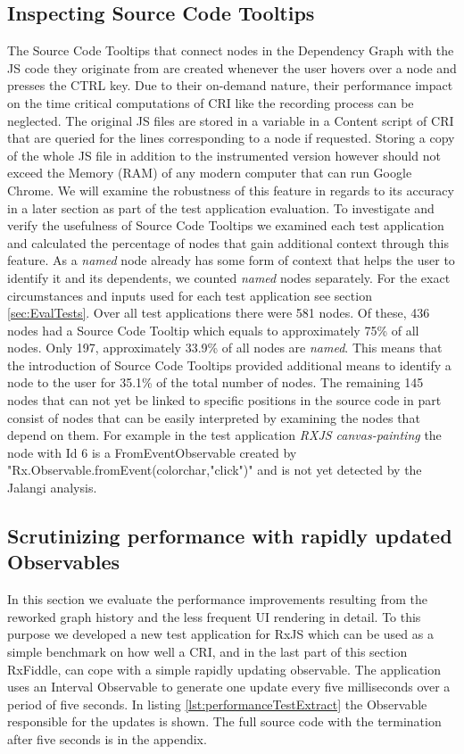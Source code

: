 	\subsection{Inspecting Source Code Tooltips}
	The Source Code Tooltips that connect nodes in the Dependency Graph with the JS code they originate from are created whenever the user hovers over a node and presses the CTRL key. Due to their on-demand nature, their performance impact on the time critical computations of CRI like the recording process can be neglected. The original JS files are stored in a variable in a Content script of CRI that are queried for the lines corresponding to a node if requested. Storing a copy of the whole JS file in addition to the instrumented version however should not exceed the Memory (RAM) of any modern computer that can run Google Chrome. We will examine the robustness of this feature in regards to its accuracy in a later section as part of the test application evaluation. To investigate and verify the usefulness of Source Code Tooltips we examined each test application and calculated the percentage of nodes that gain additional context through this feature. As a \emph{named} node already has some form of context that helps the user to identify it and its dependents, we counted \emph{named} nodes separately. For the exact circumstances and inputs used for each test application see section \ref{sec:EvalTests}. Over all test applications there were 581 nodes. Of these, 436 nodes had a Source Code Tooltip which equals to approximately 75\% of all nodes. Only 197, approximately 33.9\% of all nodes are \emph{named}. This means that the introduction of Source Code Tooltips provided additional means to identify a node to the user for 35.1\% of the total number of nodes. The remaining 145 nodes that can not yet be linked to specific positions in the source code in part consist of nodes that can be easily interpreted by examining the nodes that depend on them. For example in the test application \emph{RXJS canvas-painting}
	the node with Id 6 is a FromEventObservable created by "Rx.Observable.fromEvent(colorchar,"click")" and is not yet detected by the Jalangi analysis.

	\subsection{Scrutinizing performance with rapidly updated Observables}
	\label{sec:PerformanceEvaluation}
	In this section we evaluate the performance improvements resulting from the reworked graph history and the less frequent UI rendering in detail. To this purpose we developed a new test application for RxJS which can be used as a simple benchmark on how well a CRI, and in the last part of this section RxFiddle, can cope with a simple rapidly updating observable. The application uses an Interval Observable to generate one update every five milliseconds over a period of five seconds. In listing \ref{lst:performanceTestExtract} the Observable responsible for the updates is shown. The full source code with the termination after five seconds is in the appendix. %
	

